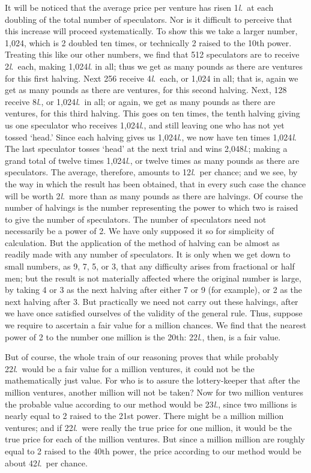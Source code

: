 \documentclass[letterpaper,12pt,oneside,openany]{memoir}
\begin{document}
It will be noticed that the average price per venture
has risen 1\textit{l}.\ at each doubling of the total number of
speculators. Nor is it difficult to perceive that this
increase will proceed systematically. To show this we
take a larger number, 1,024, which is 2 doubled ten
times, or technically 2 raised to the 10th power. Treating
this like our other numbers, we find that 512 speculators
are to receive 2\textit{l}.\ each, making 1,024\textit{l}. in all;
thus we get as many pounds as there are ventures for
this first halving. Next 256 receive 4\textit{l}.\ each, or 1,024
in all; that is, again we get as many pounds as there
are ventures, for this second halving. Next, 128
receive 8\textit{l}., or 1,024\textit{l}.\ in all; or again, we get as many
pounds as there are ventures, for this third halving.
This goes on ten times, the tenth halving giving us one
speculator who receives 1,024\textit{l}., and still leaving one
who has not yet tossed `head.' Since each halving
gives us 1,024\textit{l}., we now have ten times 1,024\textit{l}. The
last speculator tosses `head' at the next trial and wins
2,048\textit{l}.; making a grand total of twelve times 1,024\textit{l}.,
or twelve times as many pounds as there are speculators.
The average, therefore, amounts to 12\textit{l}.\ per chance; and
we see, by the way in which the result has been obtained,
that in every such case the chance will be worth
2\textit{l}.\ more than as many pounds as there are halvings.
Of course the number of halvings is the number representing
the power to which two is raised to give the
number of speculators. The number of speculators
need not necessarily be a power of 2. We have only
supposed it so for simplicity of calculation. But the application
of the method of halving can be almost as readily
made with any number of speculators. It is only when
we get down to small numbers, as 9, 7, 5, or 3, that any
difficulty arises from fractional or half men; but the
result is not materially affected where the original
number is large, by taking 4 or 3 as the next halving
after either 7 or 9 (for example), or 2 as the next
halving after 3. But practically we need not carry out
these halvings, after we have once satisfied ourselves of
the validity of the general rule. Thus, suppose we
require to ascertain a fair value for a million chances.
We find that the nearest power of 2 to the number one
million is the 20th: 22\textit{l}., then, is a fair value.

But of course, the whole train of our reasoning
proves that while probably 22\textit{l}.\ would be a fair value for
a million ventures, it could not be the mathematically
just value. For who is to assure the lottery-keeper
that after the million ventures, another million will not
be taken? Now for two million ventures the probable
value according to our method would be 23\textit{l}., since two
millions is nearly equal to 2 raised to the 21st power.
There might be a million million ventures; and if 22\textit{l}.\ were
really the true price for one million, it would be
the true price for each of the million ventures. But
since a million million are roughly equal to 2 raised to
the 40th power, the price according to our method would
be about 42\textit{l}.\ per chance.
\end{document}

